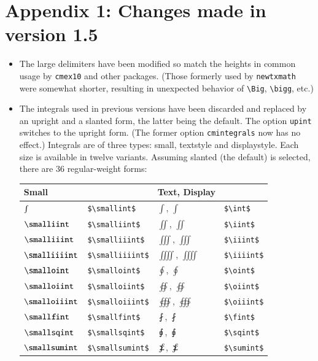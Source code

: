 \documentclass[11pt]{article}
\theoremstyle{oldplain}
\theoremstyle{plain}
\begin{document}
\section{Appendix 1: Changes made in version 1.5}
\begin{itemize}
\item
The large delimiters have been modified so match the heights in common usage by \texttt{cmex10} and other packages. (Those formerly used by \texttt{newtxmath} were somewhat shorter, resulting in unexpected behavior of \verb|\Big|, \verb|\bigg|, etc.)
\item
The integrals used in previous versions have been discarded and replaced by an upright and a slanted form, the latter being the default. The option {\tt upint} switches to the upright form. (The former option {\tt cmintegrals} now has no effect.) Integrals are of three types: small, textstyle and displaystyle. Each size is available in twelve variants. Assuming slanted (the default) is selected, there are 36 regular-weight forms:
\setlength{\extrarowheight}{8pt}
\begin{center}
  \begin{tabular}{@{} llll @{}}
    \toprule
     Small && Text, Display& \\ 
    \midrule
$\smallint$  & \verb|$\smallint$|& $\int$, $\displaystyle{\int}$& \verb|$\int$|\\ 
$\smalliint$  & \verb|$\smalliint$|& $\iint$, $\displaystyle{\iint}$&\verb|$\iint$|\\ 
$\smalliiint$  & \verb|$\smalliiint$|& $\iiint$, $\displaystyle{\iiint}$& \verb|$\iiint$|\\ 
$\smalliiiint$  & \verb|$\smalliiiint$|& $\iiiint$, $\displaystyle{\iiiint}$& \verb|$\iiiint$|\\ 
$\smalloint$  & \verb|$\smalloint$|& $\oint$, $\displaystyle{\oint}$& \verb|$\oint$|\\ 
$\smalloiint$  & \verb|$\smalloiint$|& $\oiint$, $\displaystyle{\oiint}$& \verb|$\oiint$|\\ 
$\smalloiiint$  & \verb|$\smalloiiint$|& $\oiiint$, $\displaystyle{\oiiint}$& \verb|$\oiiint$|\\ 
$\smallfint$  & \verb|$\smallfint$|& $\fint$, $\displaystyle{\fint}$& \verb|$\fint$|\\ 
$\smallsqint$  & \verb|$\smallsqint$|& $\sqint$, $\displaystyle{\sqint}$& \verb|$\sqint$|\\ 
$\smallsumint$  & \verb|$\smallsumint$|& $\sumint$, $\displaystyle{\sumint}$& \verb|$\sumint$|\\ 

\end{tabular}
\end{center}
\end{itemize}
\end{document}
